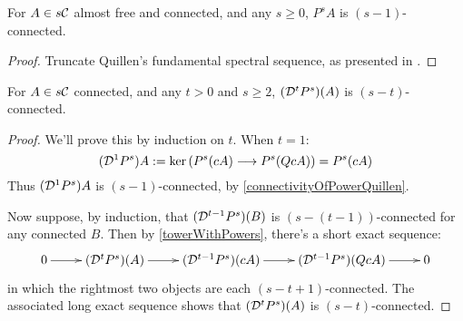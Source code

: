 \documentclass[10pt]{article}
\newcommand{\Comm}{\calC}
\begin{document}
\begin{convergence}
\begin{prop}\label{connectivityOfPowerQuillen}
For $A\in s\Comm$ almost free and connected, and any $s\geq0$, $P^{s}A$ is $(s-1)$-connected.
\end{prop}
\begin{proof}
Truncate Quillen's fundamental spectral sequence, as presented in \cite[thm 6.2]{MR1089001}.
\end{proof}
\begin{cor}\label{connectivityOfDerivedPowers}
For $A\in s\Comm$ connected, and any $t>0$ and $s\geq2$, $(\mathcal{D}^{\smash{t}}P^{s})(A)$ is $(s-t)$-connected.
\end{cor}
\begin{proof}
We'll prove this by induction on $t$. When $t=1$:
\[(\mathcal{D}^{\smash{1}}P^{s})A:=\textup{ker}\,(P^{s}(cA)\longrightarrow P^{s}(QcA))=P^{s}(cA)\]
Thus $(\mathcal{D}^{\smash{1}}P^{s})A$ is $(s-1)$-connected, by \ref{connectivityOfPowerQuillen}.

Now suppose, by induction, that $(\mathcal{D}^{\smash{t-1}}P^{s})(B)$ is $(s-(t-1))$-connected for any connected $B$. Then by \ref{towerWithPowers}, there's a short exact sequence:
\[\xymatrix{
0\ar[r]&
(\caldup{t}P^{s})(A)\ar[r]&
(\caldup{t-1}P^{s})(cA)\ar[r]&
(\caldup{t-1}P^{s})(QcA)\ar[r]&
0
}\]
in which the rightmost two objects are each $(s-t+1)$-connected. The associated long exact sequence shows that $(\mathcal{D}^{\smash{t}}P^{s})(A)$ is $(s-t)$-connected.
\end{proof}


\end{convergence}
\end{document}

